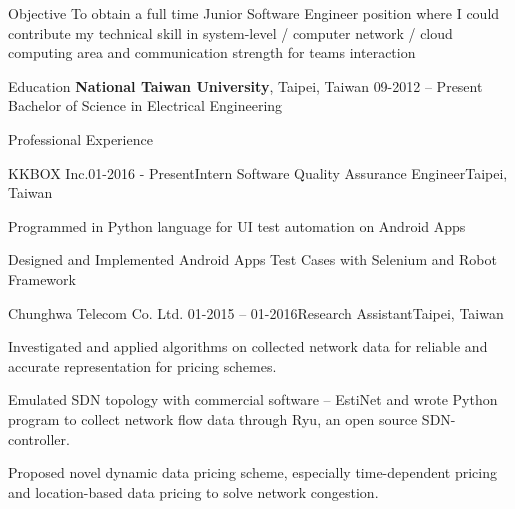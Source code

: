 \documentclass[letterpaper]{resume} %
\begin{document}

\begin{rSection}{Objective}
To obtain a full time Junior Software Engineer position where I could contribute my technical skill in system-level / computer network / cloud computing area and communication strength for teams interaction
\end{rSection}
\vspace{-0.6\baselineskip}

\begin{rSection}{Education}
{\bf National Taiwan University}, Taipei, Taiwan \hfill {09-2012 -- Present} \\ 
Bachelor of Science in Electrical Engineering
\end{rSection}
\vspace{-0.6\baselineskip}


\begin{rSection}{Professional Experience}
\begin{rSubsection}{KKBOX Inc.}{01-2016 - Present}{Intern Software Quality Assurance Engineer}{Taipei, Taiwan}
\item Programmed in Python language for UI test automation on Android Apps
\item Designed and Implemented Android Apps Test Cases with Selenium and Robot Framework
\end{rSubsection}
\vspace{-0.6\baselineskip}

\begin{rSubsection}{ Chunghwa Telecom Co. Ltd.  \textnormal{}}{01-2015 -- 01-2016}{Research Assistant}{Taipei, Taiwan}
\item Investigated and applied algorithms on collected network data for reliable and accurate representation for pricing schemes.
\item Emulated SDN topology with commercial software -- EstiNet and wrote Python program to collect network flow data through Ryu, an open source SDN-controller.
\item Proposed novel dynamic data pricing scheme, especially time-dependent pricing and location-based data pricing to solve network congestion.
\end{rSubsection}

\end{rSection}
\vspace{-0.6\baselineskip}
\end{document}
